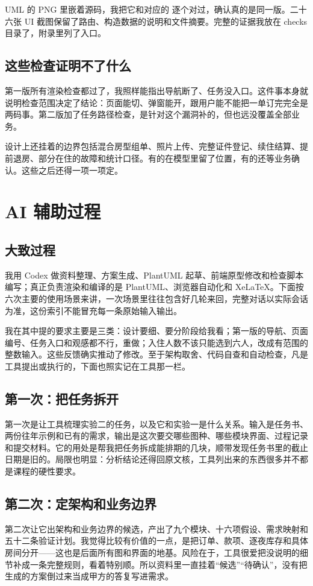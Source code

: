 \documentclass[UTF8,a4paper,zihao=-4,fontset=none]{ctexart}
\newcommand{\pathtext}[1]{\texttt{\detokenize{#1}}}
\begin{document}
UML 的 PNG 里嵌着源码，我把它和对应的 \pathtext{.puml} 逐个对过，确认真的是同一版。二十六张 UI 截图保留了路由、构造数据的说明和文件摘要。完整的证据我放在 checks 目录了，附录里列了入口。

\subsection{这些检查证明不了什么}
第一版所有渲染检查都过了，我照样能指出导航断了、任务没入口。这件事本身就说明检查范围决定了结论：页面能切、弹窗能开，跟用户能不能把一单订完完全是两码事。第二版加了任务路径检查，是针对这个漏洞补的，但也远没覆盖全部业务。

设计上还挂着的边界包括混合房型组单、照片上传、完整证件登记、续住结算、提前退房、部分在住的故障和统计口径。有的在模型里留了位置，有的还等业务确认。这些之后还得一项一项定。

\section{AI 辅助过程}
\subsection{大致过程}
我用 Codex 做资料整理、方案生成、PlantUML 起草、前端原型修改和检查脚本编写；真正负责渲染和编译的是 PlantUML、浏览器自动化和 XeLaTeX。下面按六次主要的使用场景来讲，一次场景里往往包含好几轮来回，完整对话以实际会话为准，这份索引不能冒充每一条原始输入输出。

我在其中提的要求主要是三类：设计要细、要分阶段给我看；第一版的导航、页面编号、任务入口和观感都不行，重做；入住人数不该只能选到六人，改成有范围的整数输入。这些反馈确实推动了修改。至于架构取舍、代码自查和自动检查，凡是工具提出或执行的，下面也照实记在工具那一栏。

\subsection{第一次：把任务拆开}
第一次是让工具梳理实验二的任务，以及它和实验一是什么关系。输入是任务书、两份往年示例和已有的需求，输出是这次要交哪些图种、哪些模块界面、过程记录和提交材料。它的用处是帮我把任务拆成能排期的几块，顺带发现任务书里的截止日期是旧的。局限也明显：分析结论还得回原文核，工具列出来的东西很多并不都是课程的硬性要求。

\subsection{第二次：定架构和业务边界}
第二次让它出架构和业务边界的候选，产出了九个模块、十六项假设、需求映射和五十二条验证计划。我觉得比较有价值的一点，是把订单、款项、逐夜库存和具体房间分开——这也是后面所有图和界面的地基。风险在于，工具很爱把没说明的细节补成一条完整规则，看着特别顺。所以资料里一直挂着“候选”“待确认”，没有把生成的方案倒过来当成甲方的答复写进需求。
\end{document}
